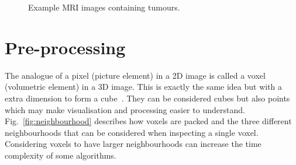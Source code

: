 \documentclass[journal]{IEEEtran}
\begin{document}
\begin{figure}
	\centering
\caption{Example MRI images containing tumours.}
\label{fig:ex}
\end{figure}











\section{Pre-processing}
\label{sec:pre}

The analogue of a pixel (picture element) in a 2D image is called a voxel (volumetric element) in a 3D image.
This is exactly the same idea but with a extra dimension to form a cube~\cite{lohmann1998volumetric}.
They can be considered cubes but also points which may make visualisation and processing easier to understand.
Fig.~\ref{fig:neighbourhood} describes how voxels are packed and the three different neighbourhoods that can be considered when inspecting a single voxel. 
Considering voxels to have larger neighbourhoods can increase the time complexity of some algorithms.
\end{document}

